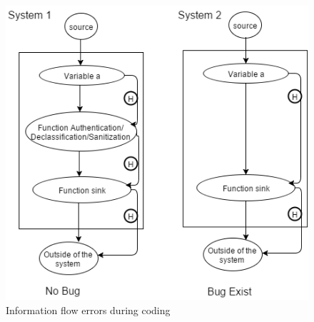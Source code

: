 \begin{figure}[htbp]
	\centering
	\includegraphics{styles/bug_detection_during_coding.png}
	\caption{Information flow errors during coding}
	\label{figure_bug_detection_during_coding}
\end{figure}
